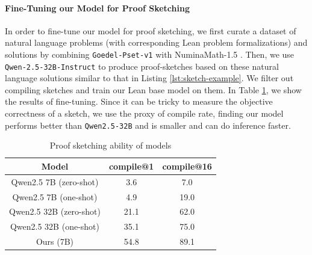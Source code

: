 


\paragraph{Fine-Tuning our Model for Proof Sketching} In order to fine-tune our model for proof sketching, we first curate a dataset of natural language problems (with corresponding Lean problem formalizations) and solutions by combining \texttt{Goedel-Pset-v1} \citep{lin2025goedel} with NuminaMath-1.5 \citep{numina_math_datasets}. Then, we use \texttt{Qwen-2.5-32B-Instruct} to produce proof-sketches based on these natural language solutions similar to that in Listing \ref{lst:sketch-example}. We filter out compiling sketches and train our Lean base model on them. In Table \ref{tab:sketch-ft-results}, we show the results of fine-tuning. Since it can be tricky to measure the objective correctness of a sketch, we use the proxy of compile rate, finding our model performs better than \texttt{Qwen2.5-32B} and is smaller and can do inference faster.

\begin{table}[H]
\caption{Proof sketching ability of models}
\label{tab:sketch-ft-results}
\centering
\begin{tabular}{ccc}
\toprule
\textbf{Model} & \textbf{compile@1} & \textbf{compile@16} \\
\midrule
Qwen2.5 7B (zero-shot) & 3.6  & 7.0 \\
Qwen2.5 7B (one-shot) & 4.9  & 19.0 \\
Qwen2.5 32B (zero-shot) & 21.1 & 62.0 \\
Qwen2.5 32B (one-shot) & 35.1 & 75.0 \\
Ours (7B) & 54.8 & 89.1 \\
\bottomrule
\end{tabular}
\end{table}


